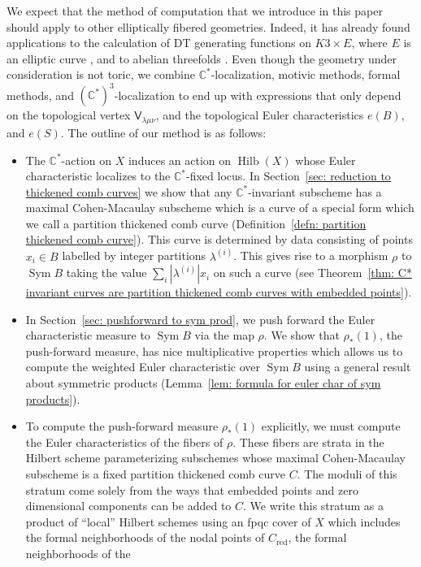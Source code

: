 \documentclass[12pt]{amsart}
\theoremstyle{definition}
\newcommand{\CC} {\mathbb{C}}          %
\newcommand{\sfV}{\mathsf{V}}
\newcommand{\Sym}{\operatorname{Sym}}
\newcommand{\Hilb}{\operatorname{Hilb}}
\newcommand{\red}{\mathrm{red}}
\begin{document}
We expect that the method of computation that we introduce in this
paper should apply to other elliptically fibered geometries. Indeed,
it has already found applications to the calculation of DT generating
functions on $K3 \times E$, where $E$ is an elliptic curve
\cite{Bryan-K3xE}, and to abelian threefolds \cite{BOPY}. Even though
the geometry under consideration is not toric, we combine
$\CC^*$-localization, motivic methods, formal methods, and
$(\CC^{*})^{3}$-localization to end up with expressions that only
depend on the topological vertex $\sfV_{\lambda\mu\nu}$, and the
topological Euler characteristics $e(B)$, and $e(S)$. The outline of
our method is as follows:
\begin{itemize}
\item The $\CC^{*}$-action on $X$ induces an action on $\Hilb (X)$
whose Euler characteristic localizes to the $\CC^{*}$-fixed locus.  In
Section~\ref{sec: reduction to thickened comb curves} we show that any
$\CC^{*}$-invariant subscheme has a maximal Cohen-Macaulay subscheme
which is a curve of a special form which we call a partition thickened
comb curve (Definition~\ref{defn: partition thickened comb
curve}). This curve is determined by data consisting of points
$x_{i}\in B$ labelled by integer partitions $\lambda^{(i)}$. This
gives rise to a morphism $\rho$ to $\Sym B$ taking the value $\sum_{i}
|\lambda^{(i)}|x_{i}$ on such a curve (see Theorem~\ref{thm: C*
invariant curves are partition thickened comb curves with embedded
points}).
\item In Section~\ref{sec: pushforward to sym prod}, we push forward
the Euler characteristic measure to $\Sym B$ via the map $\rho$. We
show that $\rho_{*}(1)$, the push-forward measure, has nice
multiplicative properties which allows us to compute the weighted
Euler characteristic over $\Sym B$ using a general result about
symmetric products (Lemma~\ref{lem: formula for euler char of sym
products}). 
\item To compute the push-forward measure $\rho_{*}(1)$ explicitly, we
must compute the Euler characteristics of the fibers of $\rho$. These
fibers are strata in the Hilbert scheme parameterizing subschemes
whose maximal Cohen-Macaulay subscheme is a fixed partition thickened
comb curve $C$. The moduli of this stratum come solely from the ways
that embedded points and zero dimensional components can be added to
$C$. We write this stratum as a product of ``local'' Hilbert schemes
using an fpqc cover of $X$ which includes the formal neighborhoods of
the nodal points of $C_{\red}$, the formal neighborhoods of the

\end{itemize}
\end{document}
